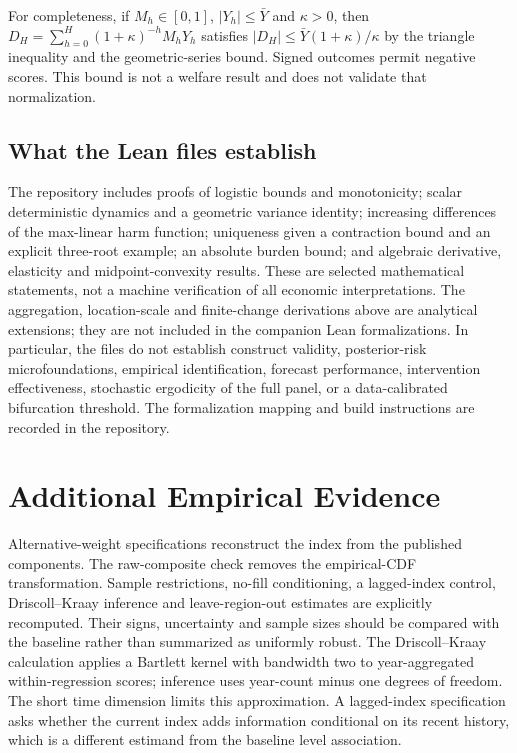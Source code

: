 For completeness, if $M_h\in[0,1]$, $|Y_h|\le\bar Y$ and $\kappa>0$,
then $D_H=\sum_{h=0}^H(1+\kappa)^{-h}M_hY_h$ satisfies
$|D_H|\le\bar Y(1+\kappa)/\kappa$ by the triangle inequality and the
geometric-series bound. Signed outcomes permit negative scores. This bound
is not a welfare result and does not validate that normalization.

\subsection{What the Lean files establish}
The repository includes proofs of logistic bounds and monotonicity;
scalar deterministic dynamics and a geometric variance identity;
increasing differences of the max-linear harm function; uniqueness given a
contraction bound and an explicit three-root example; an absolute burden
bound; and algebraic derivative, elasticity and midpoint-convexity results.
These are selected mathematical statements, not a machine verification of
all economic interpretations. The aggregation, location-scale and finite-change
derivations above are analytical extensions; they are not included in the
companion Lean formalizations. In particular, the files do not establish
construct validity, posterior-risk microfoundations, empirical identification,
forecast performance, intervention effectiveness, stochastic ergodicity of
the full panel, or a data-calibrated bifurcation threshold. The formalization
mapping and build instructions are recorded in the repository.

\section{Additional Empirical Evidence}\label{app:empirical}



Alternative-weight specifications reconstruct the index from the published
components. The raw-composite check removes the empirical-CDF transformation.
Sample restrictions, no-fill conditioning, a lagged-index control,
Driscoll--Kraay inference and leave-region-out estimates are explicitly
recomputed. Their signs, uncertainty and sample sizes should be compared with
the baseline rather than summarized as uniformly robust. The
Driscoll--Kraay calculation applies a Bartlett kernel with bandwidth two to
year-aggregated within-regression scores; inference uses year-count minus one
degrees of freedom. The short time dimension limits this approximation.
A lagged-index specification asks whether the current index adds information
conditional on its recent history, which is a different estimand from the
baseline level association.

